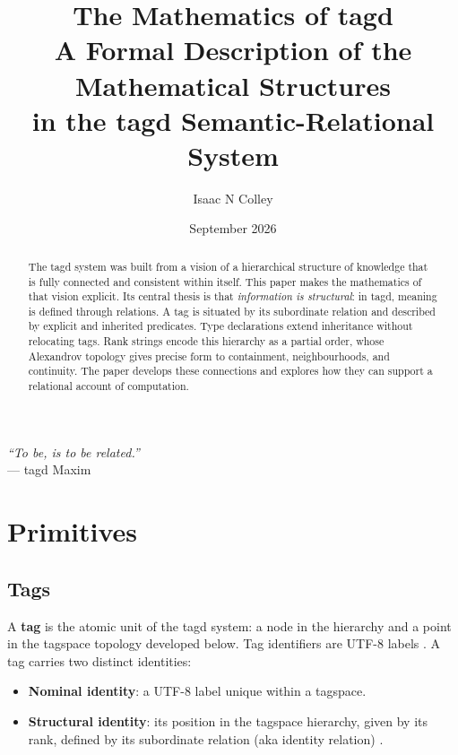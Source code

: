 \documentclass{article}
\title{\textbf{The Mathematics of tagd}\\
\large A Formal Description of the Mathematical Structures\\
in the tagd Semantic-Relational System}
\author{Isaac N Colley}
\date{September 2026}
\begin{document}

\maketitle

\begin{center}
    \textit{``To be, is to be related.''} \\[0.5ex]
    \small --- tagd Maxim
\end{center}

\begin{abstract}
The tagd system was built from a vision of a hierarchical structure of knowledge
that is fully connected and consistent within itself. This paper makes the
mathematics of that vision explicit. Its central thesis is that
\emph{information is structural}: in tagd, meaning is defined through relations.
A tag is situated by its subordinate relation and described by explicit and
inherited predicates. Type declarations extend inheritance without relocating tags.
Rank strings encode this hierarchy as a partial order, whose Alexandrov topology
gives precise form to containment, neighbourhoods, and continuity. The paper
develops these connections and explores how they can support a relational
account of computation.
\end{abstract}

\tableofcontents
\bigskip

\section{Primitives}

\subsection{Tags}

A \textbf{tag} is the atomic unit of the tagd system: a node in the
hierarchy and a point in the tagspace topology developed below. Tag
identifiers are UTF-8 labels \cite{readme}. A tag carries two distinct identities:

\begin{itemize}
  \item \textbf{Nominal identity}: a UTF-8 label unique within a tagspace.
  \item \textbf{Structural identity}: its position in the tagspace hierarchy,
        given by its rank, defined by its subordinate relation (aka identity
        relation) \cite{spec}.
\end{itemize}
\end{document}
